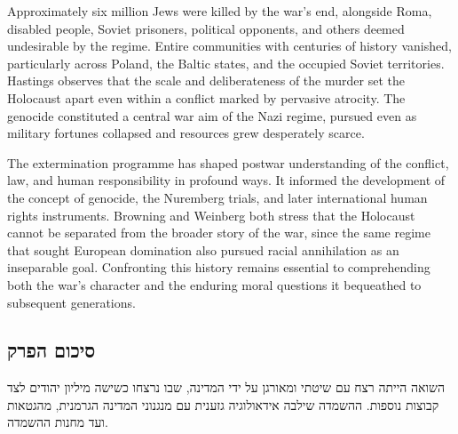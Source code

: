 Approximately six million Jews were killed by the war's end, alongside Roma, disabled people, Soviet prisoners, political opponents, and others deemed undesirable by the regime. Entire communities with centuries of history vanished, particularly across Poland, the Baltic states, and the occupied Soviet territories. Hastings observes that the scale and deliberateness of the murder set the Holocaust apart even within a conflict marked by pervasive atrocity. The genocide constituted a central war aim of the Nazi regime, pursued even as military fortunes collapsed and resources grew desperately scarce.

The extermination programme has shaped postwar understanding of the conflict, law, and human responsibility in profound ways. It informed the development of the concept of genocide, the Nuremberg trials, and later international human rights instruments. Browning and Weinberg both stress that the Holocaust cannot be separated from the broader story of the war, since the same regime that sought European domination also pursued racial annihilation as an inseparable goal. Confronting this history remains essential to comprehending both the war's character and the enduring moral questions it bequeathed to subsequent generations. \cite{browning2004} \cite{weinberg1994} \cite{hastings2011}

\bigskip
\begin{otherlanguage}{hebrew}
\subsection*{סיכום הפרק}

השואה הייתה רצח עם שיטתי ומאורגן על ידי המדינה, שבו נרצחו כשישה מיליון יהודים לצד קבוצות נוספות. ההשמדה שילבה אידאולוגיה גזענית עם מנגנוני המדינה הגרמנית, מהגטאות ועד מחנות ההשמדה.

\end{otherlanguage}

\clearpage
